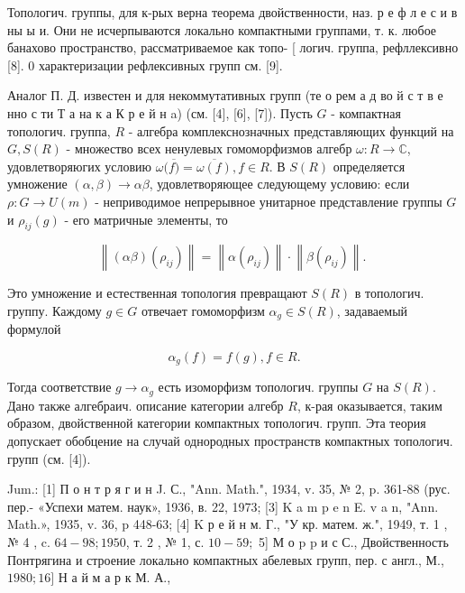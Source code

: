 \documentclass[10pt]{article}
\begin{document}
Топологич. группы, для к-рых верна теорема двойственности, наз. р е ф л е с и в ны ы и. Они не исчерпываются локально компактными группами, т. к. любое банахово пространство, рассматриваемое как топо- [ логич. группа, рефллексивно [8]. 0 характеризации рефлексивных групп см. [9].



Аналог П. Д. известен и для некоммутативных групп (те о рем а д во й с т в е нно с ти Т а на к а К р е й н a) (см. [4], [6], [7]). Пусть $G$ - компактная топологич. группа, $R$ - алгебра комплекснозначных представляющих функций на $G, S(R)$ - множество всех ненулевых гомоморфизмов алгебр $\omega: R \rightarrow \mathbb{C}$, удовлетворяюгих условию $\omega(\overline{f)}=\overline{\omega(f)}, f \in R$. В $S(R)$ определяется умножение $(\alpha, \beta) \rightarrow \alpha \beta$, удовлетворяющее следующему условию: если $\rho: G \rightarrow U(m)$ - неприводимое непрерывное унитарное представление группы $G$ и $\rho_{i j}(g)$ - его матричные элементы, то



\[

\left\|(\alpha \beta)\left(\rho_{i j}\right)\right\|=\left\|\alpha\left(\rho_{i j}\right)\right\| \cdot\left\|\beta\left(\rho_{i j}\right)\right\| \text {. }

\]



Это умножение и естественная топология превращают $S(R)$ в топологич. группу. Каждому $g \in G$ отвечает гомоморфизм $\alpha_{g} \in S(R)$, задаваемый формулой



\[

\alpha_{g}(f)=f(g), f \in R .

\]



Тогда соответствие $g \rightarrow \alpha_{g}$ есть изоморфизм топологич. группы $G$ на $S(R)$. Дано также алгебраич. описание категории алгебр $R$, к-рая оказывается, таким образом, двойственной категории компактных топологич. групп. Эта теория допускает обобцение на случай однородных пространств компактных топологич. групп (см. [4]).



Jum.: [1] П о н т р я г и н J. С., "Ann. Math.", 1934, v. 35, № 2, p. 361-88 (рус. пер.- «Успехи матем. наук», 1936, в. 22, 1973; [3] K a m p e n E. v a n, "Ann. Math.», 1935, v. 36, p 448-63; [4] K р е й н м. Г., "У кр. матем. ж.", 1949, т. 1 , № 4 , c. $64-98 ; 1950$, т. 2 , № 1, с. $10-59 ;$ 5] М о p p и с С., Двойственность Понтрягина и строение локально компактных абелевых групп, пер. с англ., М., $1980 ; 16]$ Н а й м а р к М. А.,
\end{document}
